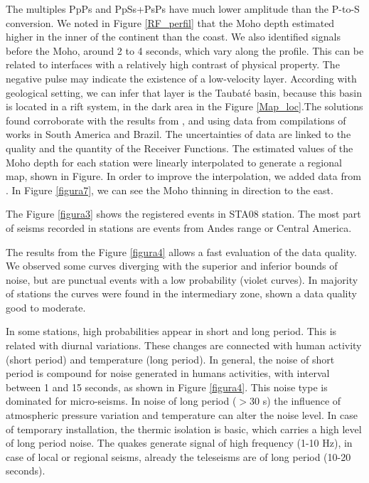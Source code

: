 The multiples PpPs and PpSs+PsPs have much lower amplitude than the P-to-S conversion. We noted in Figure \ref{RF_perfil} that the Moho depth estimated higher in the inner of the continent than the coast. We also identified signals before the Moho, around 2 to 4 seconds, which vary along the profile. This can be related to interfaces with a relatively high contrast of physical property. The negative pulse may indicate the existence of a low-velocity layer. According with geological setting, we can infer that layer is the Taubat\'{e} basin, because this basin is located in a rift system, in the dark area in the Figure \ref{Map_loc}.The solutions found corroborate with the results from \cite{assumpcao_models_2013}, \cite{assumpcao_crustal_2013} and \cite{van_der_meijde_gravity_2013}  using data from compilations of works in South America and Brazil. The uncertainties of data are linked to the quality and the quantity of the Receiver Functions. The estimated values of the Moho depth for each station were linearly interpolated to generate a regional map, shown in Figure. In order to improve the interpolation, we added data from \citep{assumpcao_crustal_2013}. In Figure \ref{figura7}, we can see the Moho thinning in direction to the east.


The Figure \ref{figura3} shows the registered events in STA08 station. The most part of seisms recorded in stations are events from Andes range or Central America.

 
The results from the Figure \ref{figura4} allows a fast evaluation of the data quality. We observed some curves diverging with the superior and inferior bounds of noise, but are punctual events with a low probability (violet curves). In majority of stations the curves were found in the intermediary zone, shown a data quality good to moderate.



In some stations, high probabilities appear in short and long period. This is related with diurnal variations. These changes are connected with human activity (short period) and temperature (long period). In general, the noise of short period is compound for noise generated in humans activities, with interval between 1 and 15 seconds, as shown in Figure \ref{figura4}. This noise type is dominated for micro-seisms. In noise of long period ($>$30 s) the influence of atmospheric pressure variation and temperature can alter the noise level. In case of temporary installation, the thermic isolation is basic, which carries a high level of long period noise. The quakes generate signal of high frequency (1-10 Hz), in case of local or regional seisms, already the teleseisms are of long period (10-20 seconds).

